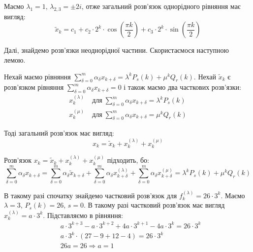 \documentclass{hw_template}
\begin{document}
Маємо $\lambda_1=1$, $\lambda_{2,3}=\pm 2i$, отже загальний розв'язок однорідного рівняння має вигляд:
\begin{equation*}
    \widetilde{x}_k = c_1 + c_2 \cdot 2^k \cdot \cos\left(\frac{\pi k}{2}\right) + c_3 \cdot 2^k \cdot \sin\left(\frac{\pi k}{2}\right)
\end{equation*}

Далі, знайдемо розв'язки неоднорідної частини. Скористаємося наступною лемою.

\begin{lemma}
    Нехай маємо рівняння $\sum_{\delta=0}^m \alpha_{\delta}x_{k+\delta} = \lambda^kP_s(k) + \mu^kQ_r(k)$. Нехай $\widetilde{x}_k$ є розв'язком рівняння $\sum_{\delta=0}^m \alpha_{\delta}x_{k+\delta} = 0$ і також маємо два часткових розв'язки:
    \begin{align*}
        x_k^{(\lambda)} & \;\text{для}\; \sum_{\delta=0}^m \alpha_{\delta}x_{k+\delta} = \lambda^kP_s(k) \\
        x_k^{(\mu)} & \;\text{для}\; \sum_{\delta=0}^m \alpha_{\delta}x_{k+\delta} = \mu^kQ_r(k)
    \end{align*}

    Тоді загальний розв'язок має вигляд:
    \begin{equation*}
        x_k = \widetilde{x}_k + x_k^{(\lambda)} + x_k^{(\mu)}
    \end{equation*}
\end{lemma}

\begin{remark}
    Розв'язок $x_k = \widetilde{x}_k + x_k^{(\lambda)} + x_k^{(\mu)}$ підходить, бо:
    \begin{equation*}
        \sum_{\delta=0}^m \alpha_{\delta}x_{k+\delta} = \sum_{\delta=0}^m \alpha_{\delta}\widetilde{x}_{k+\delta} + \sum_{\delta=0}^m \alpha_{\delta}x_{k+\delta}^{(\lambda)} + \sum_{\delta=0}^m \alpha_{\delta}x_{k+\delta}^{(\mu)} = \lambda^kP_s(k) + \mu^kQ_r(k)
    \end{equation*}
\end{remark}

В такому разі спочатку знайдемо частковий розв'язок для $f_k^{(\lambda)} = 26 \cdot 3^k$. Маємо $\lambda = 3$, $P_s(k)=26$, $s=0$. В такому разі частковий розв'язок має вигляд $x_k^{(\lambda)} = a \cdot 3^k$. Підставляємо в рівняння:
\begin{align*}
    &a \cdot 3^{k+3} - a \cdot 3^{k+2} + 4a \cdot 3^{k+1} - 4a \cdot 3^k = 26 \cdot 3^k \\
    &a \cdot 3^k \cdot (27 - 9 + 12 - 4) = 26 \cdot 3^k \\
    &26a = 26 \Rightarrow a=1
\end{align*}
\end{document}

